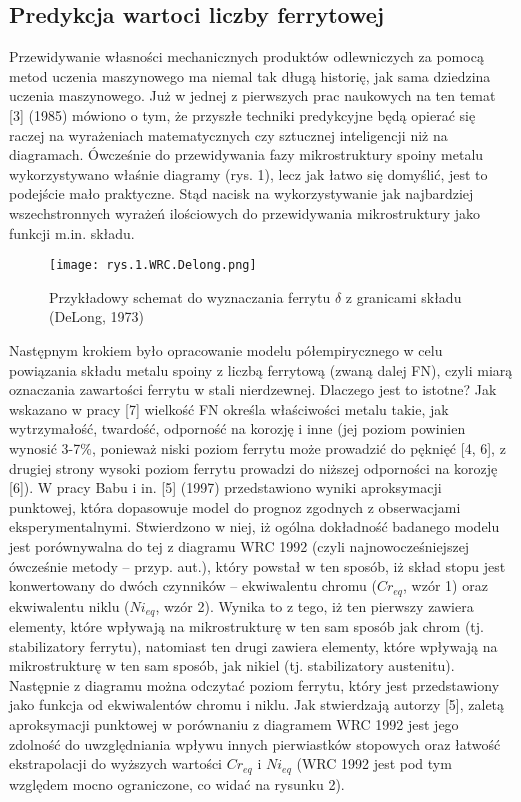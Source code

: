 \subsection{Predykcja wartoci liczby ferrytowej}

Przewidywanie własności mechanicznych produktów odlewniczych za pomocą metod uczenia maszynowego ma niemal tak długą historię, jak sama dziedzina uczenia maszynowego. Już w jednej z pierwszych prac naukowych na ten temat [3] (1985) mówiono o tym, że przyszłe techniki predykcyjne będą opierać się raczej na wyrażeniach matematycznych czy sztucznej inteligencji niż na diagramach. 
Ówcześnie do przewidywania fazy mikrostruktury spoiny metalu wykorzystywano właśnie diagramy (rys. 1), lecz jak łatwo się domyślić, jest to podejście mało praktyczne. Stąd nacisk na wykorzystywanie jak najbardziej wszechstronnych wyrażeń ilościowych do przewidywania mikrostruktury jako funkcji m.in. składu.

\begin{figure}[h]
    \centering
    \texttt{[image: rys.1.WRC.Delong.png]}
    \caption{Przykładowy schemat do wyznaczania ferrytu $ \delta $ z granicami składu (DeLong, 1973)}
    \label{fig:mesh1}
\end{figure}

Następnym krokiem było opracowanie modelu półempirycznego w celu powiązania składu metalu spoiny z liczbą ferrytową (zwaną dalej FN), czyli miarą oznaczania zawartości ferrytu w stali nierdzewnej. Dlaczego jest to istotne? Jak wskazano w pracy [7] wielkość FN określa właściwości metalu takie, jak wytrzymałość, twardość, odporność na korozję i inne (jej poziom powinien wynosić 3-7\%, ponieważ niski poziom ferrytu może prowadzić do pęknięć [4, 6], z drugiej strony wysoki poziom ferrytu prowadzi do niższej odporności na korozję [6]). 
W pracy Babu i in. [5] (1997) przedstawiono wyniki aproksymacji punktowej, która dopasowuje model do prognoz zgodnych z obserwacjami eksperymentalnymi. Stwierdzono w niej, iż ogólna dokładność badanego modelu jest porównywalna do tej z diagramu WRC 1992 (czyli najnowocześniejszej ówcześnie metody – przyp. aut.), który powstał w ten sposób, iż skład stopu jest konwertowany do dwóch czynników – ekwiwalentu chromu ($Cr_{eq}$, wzór 1) oraz ekwiwalentu niklu ($Ni_{eq}$, wzór 2). Wynika to z tego, iż ten pierwszy zawiera elementy, które wpływają na mikrostrukturę w ten sam sposób jak chrom (tj. stabilizatory ferrytu), natomiast ten drugi zawiera elementy, które wpływają na mikrostrukturę w ten sam sposób, jak nikiel (tj. stabilizatory austenitu). Następnie z diagramu można odczytać poziom ferrytu, który jest przedstawiony jako funkcja od ekwiwalentów chromu i niklu. Jak stwierdzają autorzy [5], zaletą aproksymacji punktowej w porównaniu z diagramem WRC 1992 jest jego zdolność do uwzględniania wpływu innych pierwiastków stopowych oraz łatwość ekstrapolacji do wyższych wartości $Cr_{eq}$ i $Ni_{eq}$ (WRC 1992 jest pod tym względem mocno ograniczone, co widać na rysunku 2).

